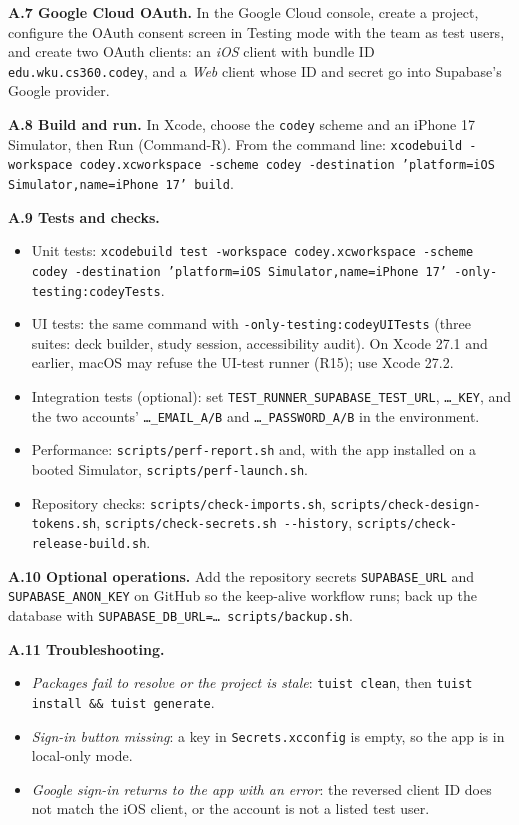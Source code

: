 \documentclass[12pt,letterpaper]{article}
\begin{document}
\textbf{A.7 Google Cloud OAuth.} In the Google Cloud console, create a project, configure
the OAuth consent screen in Testing mode with the team as test users, and create two
OAuth clients: an \emph{iOS} client with bundle ID \texttt{edu.wku.cs360.codey}, and a
\emph{Web} client whose ID and secret go into Supabase's Google provider.

\textbf{A.8 Build and run.} In Xcode, choose the \texttt{codey} scheme and an iPhone 17
Simulator, then Run (Command-R). From the command line:
\texttt{xcodebuild -workspace codey.xcworkspace -scheme codey -destination
'platform=iOS Simulator,name=iPhone 17' build}.

\textbf{A.9 Tests and checks.}
\begin{itemize}
  \item Unit tests: \texttt{xcodebuild test -workspace codey.xcworkspace -scheme codey
        -destination 'platform=iOS Simulator,name=iPhone 17'
        -only-testing:codeyTests}.
  \item UI tests: the same command with \texttt{-only-testing:codeyUITests} (three
        suites: deck builder, study session, accessibility audit). On Xcode 27.1 and
        earlier, macOS may refuse the UI-test runner (R15); use Xcode 27.2.
  \item Integration tests (optional): set \texttt{TEST\_RUNNER\_SUPABASE\_TEST\_URL},
        \texttt{\ldots\_KEY}, and the two accounts' \texttt{\ldots\_EMAIL\_A/B} and
        \texttt{\ldots\_PASSWORD\_A/B} in the environment.
  \item Performance: \texttt{scripts/perf-report.sh} and, with the app installed on a
        booted Simulator, \texttt{scripts/perf-launch.sh}.
  \item Repository checks: \texttt{scripts/check-imports.sh},
        \texttt{scripts/check-design-tokens.sh},
        \texttt{scripts/check-secrets.sh -{}-history},
        \texttt{scripts/check-release-build.sh}.
\end{itemize}

\textbf{A.10 Optional operations.} Add the repository secrets \texttt{SUPABASE\_URL}
and \texttt{SUPABASE\_ANON\_KEY} on GitHub so the keep-alive workflow runs; back up
the database with \texttt{SUPABASE\_DB\_URL=\ldots{} scripts/backup.sh}.

\textbf{A.11 Troubleshooting.}
\begin{itemize}
  \item \emph{Packages fail to resolve or the project is stale}: \texttt{tuist clean},
        then \texttt{tuist install \&\& tuist generate}.
  \item \emph{Sign-in button missing}: a key in \texttt{Secrets.xcconfig} is empty, so
        the app is in local-only mode.
  \item \emph{Google sign-in returns to the app with an error}: the reversed client ID
        does not match the iOS client, or the account is not a listed test user.
\end{itemize}
\end{document}
